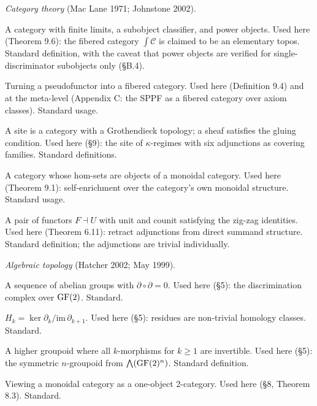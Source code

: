 \emph{Category theory} (Mac Lane 1971; Johnstone 2002).
\begin{description}[nosep,leftmargin=1.5cm]
  \item[Topos] A category with finite limits, a subobject
    classifier, and power objects. Used here (Theorem 9.6):
    the fibered category $\int \mathcal{C}$ is claimed to
    be an elementary topos. Standard definition, with the
    caveat that power objects are verified for
    single-discriminator subobjects only (\S B.4).
  \item[Grothendieck construction] Turning a pseudofunctor
    into a fibered category. Used here (Definition 9.4)
    and at the meta-level (Appendix C: the SPPF as a
    fibered category over axiom classes). Standard usage.
  \item[Sheaf / site] A site is a category with a
    Grothendieck topology; a sheaf satisfies the gluing
    condition. Used here (\S9): the site of
    $\kappa$-regimes with six adjunctions as covering
    families. Standard definitions.
  \item[Enriched category] A category whose hom-sets are
    objects of a monoidal category. Used here (Theorem
    9.1): self-enrichment over the category's own monoidal
    structure. Standard usage.
  \item[Adjunction] A pair of functors $F \dashv U$ with
    unit and counit satisfying the zig-zag identities.
    Used here (Theorem 6.11): retract adjunctions from
    direct summand structure. Standard definition;
    the adjunctions are trivial individually.
\end{description}

\emph{Algebraic topology} (Hatcher 2002; May 1999).
\begin{description}[nosep,leftmargin=1.5cm]
  \item[Chain complex] A sequence of abelian groups with
    $\partial \circ \partial = 0$. Used here (\S5):
    the discrimination complex over $\operatorname{GF}(2)$. Standard.
  \item[Homology] $H_k = \ker \partial_k / \mathrm{im}\,
    \partial_{k+1}$. Used here (\S5): residues are
    non-trivial homology classes. Standard.
  \item[$n$-groupoid] A higher groupoid where all
    $k$-morphisms for $k \geq 1$ are invertible. Used
    here (\S5): the symmetric $n$-groupoid from
    $\bigwedge(\operatorname{GF}(2)^n)$. Standard definition.
  \item[Delooping] Viewing a monoidal category as a
    one-object 2-category. Used here (\S8, Theorem 8.3).
    Standard.
\end{description}


